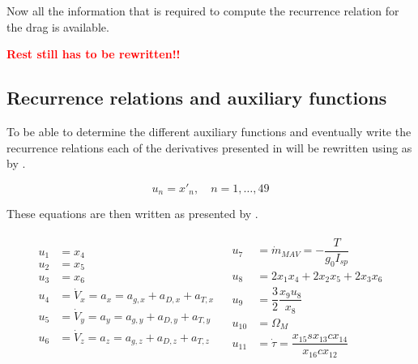 Now all the information that is required to compute the recurrence relation for the drag is available.










 \textbf{\textcolor{red}{Rest still has to be rewritten!!}}



\subsection{Recurrence relations and auxiliary functions}
\label{subsec:recRelAuxFunc}
To be able to determine the different auxiliary functions and eventually write the recurrence relations each of the derivatives presented in  will be rewritten using  as by \cite{scott2008high}. 

\begin{equation} \label{eq:un}
u_{n}=x'_{n}, \quad n=1,\dotsc,49
\end{equation}

These equations are then written as presented by .

\begin{align} \label{eq:unAuxEq1}
\begin{split} 
u_{1}&=x_{4}\\
u_{2}&=x_{5}\\
u_{3}&=x_{6} \\
u_{4}&=\dot{V}_{x}=a_{x}=a_{g,x}+a_{D,x}+a_{T,x}\\
u_{5}&=\dot{V}_{y}=a_{y}=a_{g,y}+a_{D,y}+a_{T,y}\\
u_{6}&=\dot{V}_{z}=a_{z}=a_{g,z}+a_{D,z}+a_{T,z}\\
\end{split}
&
\begin{split}
u_{7} &=\dot{m}_{MAV}=-\dfrac{T}{g_{0}I_{sp}}\\
u_{8}&=2x_{1}x_{4}+2x_{2}x_{5}+2x_{3}x_{6}\\
u_{9}&=\dfrac{3}{2}\dfrac{x_{9}u_{8}}{x_{8}}\\
u_{10} &= \Omega_{M} \\
u_{11} &=  \dot{\tau} = \dfrac{x_{15}sx_{13}cx_{14}}{x_{16}cx_{12}}\\
\end{split}
\end{align}

